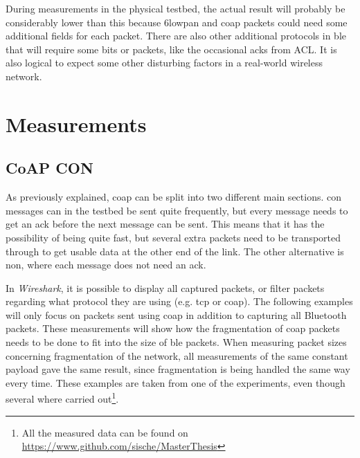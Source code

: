 

\noindent During measurements in the physical testbed, the actual result will probably be considerably lower than this because \gls{6lowpan} and \gls{coap} packets could need some additional fields for each packet. There are also other additional protocols in \gls{ble} that will require some bits or packets, like the occasional \glspl{ack} from ACL. It is also logical to expect some other disturbing factors in a real-world wireless network. 


\section{Measurements}

\subsection{CoAP CON}

\noindent As previously explained, \gls{coap} can be split into two different main sections. \gls{con} messages can in the testbed be sent quite frequently, but every message needs to get an \gls{ack} before the next message can be sent. This means that it has the possibility of being quite fast, but several extra packets need to be transported through to get usable data at the other end of the link. The other alternative is \gls{non}, where each message does not need an \gls{ack}. 






\noindent In \textit{Wireshark}, it is possible to display all captured packets, or filter packets regarding what protocol they are using (e.g. \gls{tcp} or \gls{coap}). The following examples will only focus on packets sent using \gls{coap} in addition to capturing all Bluetooth packets. These measurements will show how the fragmentation of \gls{coap} packets needs to be done to fit into the size of \gls{ble} packets. When measuring packet sizes concerning fragmentation of the network, all measurements of the same constant \gls{payload} gave the same result, since fragmentation is being handled the same way every time. These examples are taken from one of the experiments, even though several where carried out\footnote{All the measured data can be found on \url{https://www.github.com/sische/MasterThesis}}. 

